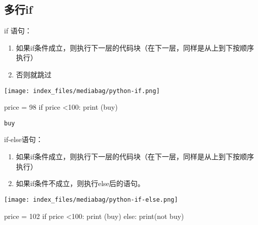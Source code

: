 \documentclass[
  letterpaper,
  DIV=11,
  numbers=noendperiod]{scrreprt}
\newenvironment{Shaded}{\begin{snugshade}}{\end{snugshade}}
\newcommand{\BuiltInTok}[1]{\textcolor[rgb]{0.00,0.23,0.31}{#1}}
\newcommand{\ControlFlowTok}[1]{\textcolor[rgb]{0.00,0.23,0.31}{#1}}
\newcommand{\DecValTok}[1]{\textcolor[rgb]{0.68,0.00,0.00}{#1}}
\newcommand{\NormalTok}[1]{\textcolor[rgb]{0.00,0.23,0.31}{#1}}
\newcommand{\OperatorTok}[1]{\textcolor[rgb]{0.37,0.37,0.37}{#1}}
\newcommand{\StringTok}[1]{\textcolor[rgb]{0.13,0.47,0.30}{#1}}
\providecommand{\tightlist}{%
  \setlength{\itemsep}{0pt}\setlength{\parskip}{0pt}}\usepackage{longtable,booktabs,array}
\begin{document}
\hypertarget{ux591aux884cif}{%
\subsection{多行if}\label{ux591aux884cif}}

if 语句：

\begin{enumerate}
\def\labelenumi{\arabic{enumi}.}
\tightlist
\item
  如果if条件成立，则执行下一层的代码块（在下一层，同样是从上到下按顺序执行）
\item
  否则就跳过
\end{enumerate}

\texttt{[image: index\_files/mediabag/python-if.png]}

\begin{Shaded}
\begin{Highlighting}[]
\NormalTok{price }\OperatorTok{=} \DecValTok{98}
\ControlFlowTok{if}\NormalTok{ price }\OperatorTok{\textless{}}\DecValTok{100}\NormalTok{:}
    \BuiltInTok{print}\NormalTok{ (}\StringTok{\textquotesingle{}buy\textquotesingle{}}\NormalTok{)}
\end{Highlighting}
\end{Shaded}

\begin{verbatim}
buy
\end{verbatim}

if-else语句：

\begin{enumerate}
\def\labelenumi{\arabic{enumi}.}
\tightlist
\item
  如果if条件成立，则执行下一层的代码块（在下一层，同样是从上到下按顺序执行）
\item
  如果if条件不成立，则执行else后的语句。
\end{enumerate}

\texttt{[image: index\_files/mediabag/python-if-else.png]}

\begin{Shaded}
\begin{Highlighting}[]
\NormalTok{price }\OperatorTok{=} \DecValTok{102}
\ControlFlowTok{if}\NormalTok{ price }\OperatorTok{\textless{}}\DecValTok{100}\NormalTok{:}
    \BuiltInTok{print}\NormalTok{ (}\StringTok{\textquotesingle{}buy\textquotesingle{}}\NormalTok{)}
\ControlFlowTok{else}\NormalTok{:}
    \BuiltInTok{print}\NormalTok{(}\StringTok{\textquotesingle{}not buy\textquotesingle{}}\NormalTok{)}
\end{Highlighting}
\end{Shaded}
\end{document}
